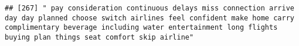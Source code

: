 \documentclass[
]{article}
\begin{document}
\begin{verbatim}
## [267] " pay consideration continuous delays miss connection arrive day day planned choose switch airlines feel confident make home carry complimentary beverage including water entertainment long flights buying plan things seat comfort skip airline"                                                                                                                                                                                                                                                                                                                                                                                                                                                                                                                                                                                                                                                                                                                                                                                                                                                                                                                                                                                                                                                                                                                                                                                                                                                                                                                                                                                                                                                                                                                                              

\end{verbatim}
\end{document}
